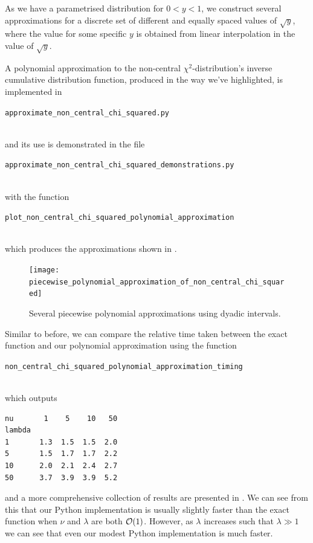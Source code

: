 \documentclass[11pt,a4paper,twoside,english]{extarticle}
\newcommand{\singlecodeline}[1]{\\[1em]\centerline{\lstinline[basicstyle=\ttfamily]$#1$}\\[1em]}
\begin{document}
As we have a parametrised distribution for $ 0 < y < 1 $, we construct several approximations for a discrete set of different and equally spaced values of $ \sqrt{y} $, where the value for some specific $ y $ is obtained from linear interpolation in the value of $ \sqrt{y} $. 

A polynomial approximation to the non-central $ \chi^2 $-distribution's inverse cumulative distribution function, produced in the way we've highlighted, is implemented in \singlecodeline{approximate_non_central_chi_squared.py}
and its use is demonstrated in the file \singlecodeline{approximate_non_central_chi_squared_demonstrations.py} with the function \singlecodeline{plot_non_central_chi_squared_polynomial_approximation}
which produces the approximations shown in .

\begin{figure}[htb]
\centering
\texttt{[image: piecewise\_polynomial\_approximation\_of\_non\_central\_chi\_squared]}
\caption{Several piecewise polynomial approximations using dyadic intervals.}
\label{fig:piecewise_polynomial_approximation_of_non_central_chi_squared}
\end{figure}

Similar to before, we can compare the relative time taken between the exact function and our polynomial approximation using the function \singlecodeline{non_central_chi_squared_polynomial_approximation_timing}
which outputs
\begin{verbatim}
nu       1    5    10   50
lambda                    
1       1.3  1.5  1.5  2.0
5       1.5  1.7  1.7  2.2
10      2.0  2.1  2.4  2.7
50      3.7  3.9  3.9  5.2
\end{verbatim}
and a more comprehensive collection of results are presented in . We can see from this that our Python implementation is usually slightly faster than the exact function when $ \nu $ and $ \lambda $ are both $ \order{1} $. However, as $ \lambda $ increases such that $ \lambda \gg 1 $ we can see that even our modest Python implementation is much faster. 
\end{document}
